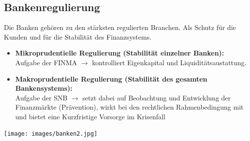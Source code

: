 \subsection{Bankenregulierung}
Die Banken gehören zu den stärksten regulierten Branchen. Als Schutz für die Kunden und für die Stabilität des Finanzsystems.\\
\begin{minipage}{0.6\linewidth}
	\begin{itemize}
		\item \textbf{Mikroprudentielle Regulierung (Stabilität einzelner Banken):}\\
		Aufgabe der FINMA $\rightarrow$ kontrolliert Eigenkapital und Liquiditätsaustattung.
		\item \textbf{Makroprudentielle Regulierung (Stabilität des gesamten Bankensystems):}\\
		Aufgabe der SNB $\rightarrow$ setzt dabei auf Beobachtung und Entwicklung der Finanzmärkte (Prävention), wirkt bei den rechtlichen Rahmenbedingung mit und bietet eine Kurzfristige Vorsorge im Krisenfall
	\end{itemize}
\vfill\null
\end{minipage}%
\hspace{0.05\linewidth}
\begin{minipage}{0.3\linewidth}
	\texttt{[image: images/banken2.jpg]}
\end{minipage}

